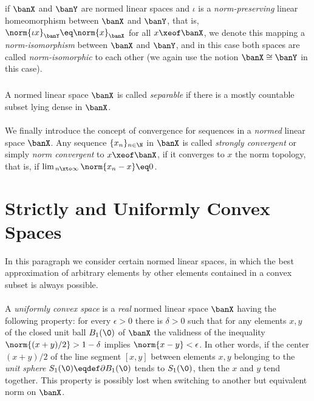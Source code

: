 \documentclass[11pt,twoside]{article}
\begin{document}
\subparagraph{} %
if $\banX$ and $\banY$ are normed linear spaces
and $\iota$ is a \textit{norm-preserving} linear homeomorphism
between $\banX$ and $\banY$,
that is,
$\norm{\iota x}_{\banY} \eq \norm{x}_{\banX}$ for all $x \xeof \banX$,
we denote this mapping a \textit{norm-isomorphism} between $\banX$ and $\banY$,
and in this case both spaces are called \textit{norm-isomorphic} to each other
(we again use the notion $\banX \cong \banY$ in this case).

\subparagraph{} %
A normed linear space $\banX$ is called \textit{separable}
if there is a mostly countable subset lying dense in $\banX$.

\paragraph{} %
We finally introduce the concept of convergence
for sequences in a \textit{normed} linear space $\banX$.
Any sequence $\{x_n\}_{n \in \N}$ in $\banX$
is called \textit{strongly convergent}
or simply \textit{norm convergent} to $x \xeof \banX$,
if it converges to $x$ {\wrt} the norm topology,
that is,
if $\lim_{\,n \xto \infty} \norm{x_n-x} \eq 0$.

\section{Strictly and Uniformly Convex Spaces}
In this paragraph we consider certain normed linear spaces,
in which the best approximation of arbitrary elements
by other elements contained in a convex subset is always possible.

\paragraph{} %
A \textit{uniformly convex space} is a \textit{real} normed linear space $\banX$
having the following property:
for every $\epsilon > 0$ there is $\delta > 0$ 
such that
for any elements $x,y$ of the closed unit ball $B_1(\0)$ of $\banX$
the validness of the inequality $\norm{(x+y)/2} > 1- \delta$
implies $\norm{x-y} < \epsilon$.
In other words,
if the center $(x+y)/2$ of the line segment $[x,y]$
between elements $x,y$ belonging to the \textit{unit sphere}
$S_1(\0) \eqdef \partial B_1(\0)$ tends to $S_1(\0)$,
then the $x$ and $y$ tend together.
This property is possibly lost
when switching to another but equivalent norm on $\banX$.
\end{document}
